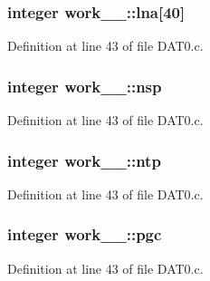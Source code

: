 \subsubsection[{\texorpdfstring{lna}{lna}}]{\setlength{\rightskip}{0pt plus 5cm}integer work\+\_\+\_\+\+::lna\mbox{[}40\mbox{]}}\hypertarget{structwork__1___aab7bfeb9281ccba8ec34102134685634}{}\label{structwork__1___aab7bfeb9281ccba8ec34102134685634}


Definition at line 43 of file D\+A\+T0.\+c.

\subsubsection[{\texorpdfstring{nsp}{nsp}}]{\setlength{\rightskip}{0pt plus 5cm}integer work\+\_\+\_\+\+::nsp}\hypertarget{structwork__1___aa7fbe70dacdeb989a9646e25d4b69e4b}{}\label{structwork__1___aa7fbe70dacdeb989a9646e25d4b69e4b}


Definition at line 43 of file D\+A\+T0.\+c.

\subsubsection[{\texorpdfstring{ntp}{ntp}}]{\setlength{\rightskip}{0pt plus 5cm}integer work\+\_\+\_\+\+::ntp}\hypertarget{structwork__1___aeff7c5574250e2f3da1e85969ce6fa8b}{}\label{structwork__1___aeff7c5574250e2f3da1e85969ce6fa8b}


Definition at line 43 of file D\+A\+T0.\+c.

\subsubsection[{\texorpdfstring{pgc}{pgc}}]{\setlength{\rightskip}{0pt plus 5cm}integer work\+\_\+\_\+\+::pgc}\hypertarget{structwork__1___af982e7b03199b7670e434495c5090a6d}{}\label{structwork__1___af982e7b03199b7670e434495c5090a6d}


Definition at line 43 of file D\+A\+T0.\+c.

